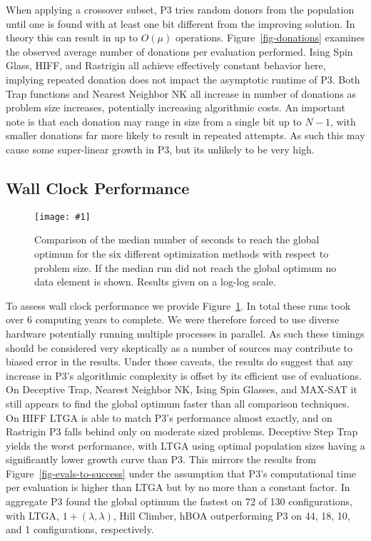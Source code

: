 \documentclass[twoside]{article}
\newcommand{\includegraphicsfit}[1]
{\texttt{[image: \#1]}}
\begin{document}
When applying a crossover subset, P3 tries random donors from the population until one is found with at least
one bit different from the improving solution. In theory this can result in up to $O(\mu)$ operations.
Figure~\ref{fig-donations} examines the observed average number of donations per evaluation performed.
Ising Spin Glass, HIFF, and Rastrigin all achieve effectively constant behavior here, implying repeated
donation does not impact the asymptotic runtime of P3. Both Trap functions and Nearest Neighbor NK all
increase in number of donations as problem size increases, potentially increasing algorithmic costs. An
important note is that each donation may range in size from a single bit up to $N-1$, with smaller
donations far more likely to result in repeated attempts. As such this may cause some super-linear growth
in P3, but its unlikely to be very high.

\subsection{Wall Clock Performance}
\begin{figure}
  \begin{center}
  \includegraphicsfit{seconds-to-success}
  \end{center}
  \caption{Comparison of the median number of seconds to reach the global optimum for
           the six different optimization methods with respect
           to problem size.  If the median run did not reach the global optimum no data element
           is shown.  Results given on a log-log scale.}
  \label{fig-seconds-to-success}
\end{figure}


To assess wall clock performance we provide Figure~\ref{fig-seconds-to-success}. In total these runs
took over 6 computing years to complete. We were therefore forced to use
diverse hardware potentially running multiple processes in parallel.
As such these timings should be considered very skeptically as a number
of sources may contribute to biased error in the results. Under those caveats, the results do suggest
that any increase in P3's algorithmic complexity is offset by its efficient use of evaluations. On
Deceptive Trap, Nearest Neighbor NK, Ising Spin Glasses, and MAX-SAT it still appears to find the global
optimum faster than all comparison techniques. On HIFF LTGA is able to match P3's performance almost exactly,
and on Rastrigin P3 falls behind only on moderate sized problems. Deceptive Step Trap yields the worst performance,
with LTGA using optimal population sizes having a significantly lower growth curve than P3. This mirrors
the results from Figure~\ref{fig-evals-to-success} under the assumption that P3's computational time per evaluation is higher
than LTGA but by no more than a constant factor. In aggregate P3 found the global optimum the fastest on 72 of 130 configurations,
with LTGA, $1+(\lambda, \lambda)$, Hill Climber, hBOA outperforming P3 on 44, 18, 10, and 1 configurations, respectively.
\end{document}
